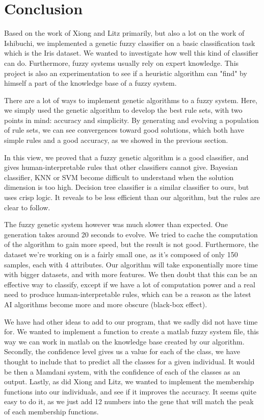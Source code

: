 \documentclass[a4paper,12pt]{article}
\begin{document}
\section{Conclusion}

Based on the work of Xiong and Litz primarily, but also a lot on the work of Ishibuchi, we implemented a genetic fuzzy classifier on a basic classification task which is the Iris dataset.
We wanted to investigate how well this kind of classifier can do. Furthermore, fuzzy systems usually rely on expert knowledge. This project is also an experimentation to see if a heuristic algorithm can "find" by himself a part of the knowledge base of a fuzzy system.

There are a lot of ways to implement genetic algorithms to a fuzzy system. Here, we simply used the genetic algorithm to develop the best rule sets, with two points in mind: accuracy and simplicity.
By generating and evolving a population of rule sets, we can see convergences toward good solutions, which both have simple rules and a good accuracy, as we showed in the previous section.

In this view, we proved that a fuzzy genetic algorithm is a good classifier, and gives human-interpretable rules that other classifiers cannot give. Bayesian classifier, KNN or SVM become difficult to understand when the solution dimension is too high.
Decision tree classifier is a similar classifier to ours, but uses crisp logic. It reveals to be less efficient than our algorithm, but the rules are clear to follow.

The fuzzy genetic system however was much slower than expected. One generation takes around 20 seconds to evolve. We tried to cache the computation of the algorithm to gain more speed, but the result is not good. Furthermore, the dataset we're working on is a fairly small one, as it's composed of only 150 samples, each with 4 attributes. Our algorithm will take exponentially more time with bigger datasets, and with more features. We then doubt that this can be an effective way to classify, except if we have a lot of computation power and a real need to produce human-interpretable rules, which can be a reason as the latest AI algorithms become more and more obscure (black-box effect).

We have had other ideas to add to our program, that we sadly did not have time for.
We wanted to implement a function to create a matlab fuzzy system file, this way we can work in matlab on the knowledge base created by our algorithm.
Secondly, the confidence level gives us a value for each of the class, we have thought to include that to predict all the classes for a given individual. It would be then a Mamdani system, with the confidence of each of the classes as an output.
Lastly, as did Xiong and Litz, we wanted to implement the membership functions into our individuals, and see if it improves the accuracy. It seems quite easy to do it, as we just add 12 numbers into the gene that will match the peak of each membership functions.

 


\nocite{*}
\end{document}
